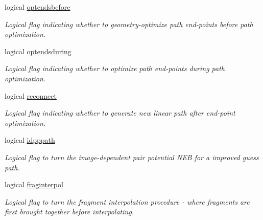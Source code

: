\begin{DoxyCompactItemize}
logical \mbox{\hyperlink{namespaceglobaldata_a56183a6a94e829385365e8cd4636798a}{optendsbefore}}
\begin{DoxyCompactList}\small\item\em Logical flag indicating whether to geometry-\/optimize path end-\/points before path optimization. \end{DoxyCompactList}\item 
\mbox{\label{namespaceglobaldata_a21a1c87f487884eb7c7be00ffbe9e798}} 
logical \mbox{\hyperlink{namespaceglobaldata_a21a1c87f487884eb7c7be00ffbe9e798}{optendsduring}}
\begin{DoxyCompactList}\small\item\em Logical flag indicating whether to optimize path end-\/points during path optimization. \end{DoxyCompactList}\item 
\mbox{\label{namespaceglobaldata_abd75cf325eb1bfd2913c1dc3e951700e}} 
logical \mbox{\hyperlink{namespaceglobaldata_abd75cf325eb1bfd2913c1dc3e951700e}{reconnect}}
\begin{DoxyCompactList}\small\item\em Logical flag indicating whether to generate new linear path after end-\/point optimization. \end{DoxyCompactList}\item 
\mbox{\label{namespaceglobaldata_a5cc2599efcc8abd01fbe7713032d0335}} 
logical \mbox{\hyperlink{namespaceglobaldata_a5cc2599efcc8abd01fbe7713032d0335}{idpppath}}
\begin{DoxyCompactList}\small\item\em Logical flag to turn the image-\/dependent pair potential N\+EB for a improved guess path. \end{DoxyCompactList}\item 
\mbox{\label{namespaceglobaldata_a6d93199d31cd8426e09c2e5337771156}} 
logical \mbox{\hyperlink{namespaceglobaldata_a6d93199d31cd8426e09c2e5337771156}{fraginterpol}}
\begin{DoxyCompactList}\small\item\em Logical flag to turn the fragment interpolation procedure -\/ where fragments are first brought together before interpolating. \end{DoxyCompactList}\item 

\end{DoxyCompactItemize}
